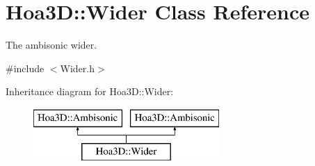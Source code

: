 \hypertarget{class_hoa3_d_1_1_wider}{\section{Hoa3\-D\-:\-:Wider Class Reference}
\label{class_hoa3_d_1_1_wider}
}


The ambisonic wider.  




{\ttfamily \#include $<$Wider.\-h$>$}

Inheritance diagram for Hoa3\-D\-:\-:Wider\-:\begin{figure}[H]
\begin{center}
\leavevmode
\includegraphics[height=2.000000cm]{class_hoa3_d_1_1_wider}
\end{center}
\end{figure}
